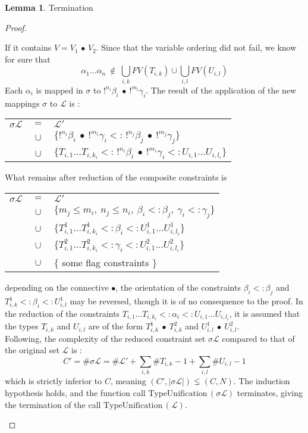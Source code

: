 \documentclass[10pt]{article}
\theoremstyle{plain}
\theoremstyle{definition}
\newtheorem{lemma}{Lemma}[section]
\begin{document}
\begin{lemma}{Termination}
\begin{proof}
\begin{itemize}
				If it contains $V = V_1 \,\bullet\, V_2$. Since that the variable ordering did not fail, we know for sure that
						$$\alpha_1 \dots \alpha_n ~ \notin ~ \bigcup_{i, k} FV(T_{i, k}) \cup \bigcup_{i, l} FV(U_{i, l})$$
				Each $\alpha_i$ is mapped in $\sigma$ to $!^{n_i} \beta_i ~ \bullet ~ !^{m_i}\gamma_i$.
				The result of the application of the new mappings $\sigma$ to $\mathcal{L}$ is :
			  	\begin{center}
			  	\begin{tabular}{lcl}
			  		$\sigma \mathcal{L}$ & $ = $ & $\mathcal{L'}$ \\
				  	& $ \cup $ & $\{!^{n_i} \beta_i ~ \bullet ~ !^{m_i}\gamma_i <: \,!^{n_j} \beta_j ~ \bullet ~ !^{m_j}\gamma_j \}$ \\
				  	& $ \cup $ & $\{ T_{i, 1} \dots T_{i, k_i} <: \,!^{n_i} \beta_i ~ \bullet ~ !^{m_i}\gamma_i <: U_{i, 1} \dots U_{i, l_i} \}$
				  \end{tabular}
				  \end{center}
       	What remains after reduction of the composite constraints is
					\begin{center}
			  	\begin{tabular}{lcl}
			  		$\sigma \mathcal{L}$ & $ = $ & $\mathcal{L'}$ \\
			  		& $ \cup $ & $\{m_j \le m_i, ~n_j \le n_i, ~\beta_i <: \beta_j, ~\gamma_i <: \gamma_j \}$ \\
			  		& $ \cup $ & $\{ T^1_{i, 1} \dots T^1_{i, k_i} <: \beta_i <: U^1_{i, 1} \dots U^1_{i, l_i} \}$ \\
			  		& $ \cup $ & $\{ T^2_{i, 1} \dots T^2_{i, k_i} <: \gamma_i <: U^2_{i, 1} \dots U^2_{i, l_i} \}$ \\
			  		& $ \cup $ & $\{$ some flag constraints $\}$
			  	\end{tabular}
			  	\end{center}
				depending on the connective $\bullet$, the orientation of the constraints $\beta_i <: \beta_j$ and $T^1_{i, k} <: \beta_i <: U^1_{i, l}$
			  may be reversed, though it is of no consequence to the proof.
			  In the reduction of the constraints $T_{i, 1} \dots T_{i, k_i} <: \alpha_i <: U_{i, 1} \dots U_{i, l_i}$, it is assumed that
			  the types $T_{i, k}$ and $U_{i, l}$ are of the form $T^1_{i, k} ~\bullet~ T^2_{i, k}$ and $U^1_{i, l} ~\bullet~ U^2_{i, l}$. \\
			  Following, the complexity of the reduced constraint set $\sigma \mathcal{L}$ compared to that of the original set $\mathcal{L}$ is :
			  	$$C' = \#\sigma\mathcal{L} = \#\mathcal{L'} + \sum_{i, k} \#T_{i, k} - 1 + \sum_{i, l} \#U_{i, l} - 1 $$
			  which is strictly inferior to $C$, meaning $(C',|\sigma\mathcal{L}|) \lneq (C, N)$. The induction hypothesis holds, and the function
			  call $\text{TypeUnification}\,(\sigma \mathcal{L})$ terminates, giving the termination of the call
			  $\text{TypeUnification}\,(\mathcal{L})$.
			  
		\end{itemize}
	\end{proof}
\end{lemma}
\end{document}
